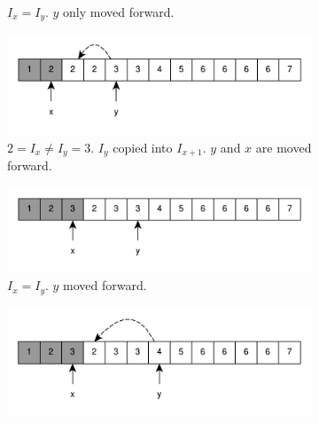 \begin{figure}
\begin{subfigure}[t]{0.49\textwidth}
		\vspace*{-8mm}
		\caption{$I_x = I_y$. $y$ only moved forward.}
		\label{fig:remove_duplicated_sorted_array_inplace:example1_3}
	 \end{subfigure}
	 \hfill
	 \begin{subfigure}[t]{0.49\textwidth}
		\includegraphics[width=1\linewidth]{sources/remove_duplicated_sorted_array_inplace/images/example1_4}
		\vspace*{-8mm}
		\caption{$2 = I_x \neq I_y = 3$. $I_y$ copied into $I_{x+1}$. $y$ and $x$ are moved forward.}
		\label{fig:remove_duplicated_sorted_array_inplace:example1_4}
	 \end{subfigure}
	 \hfill
	 \begin{subfigure}[t]{0.49\textwidth}
		\includegraphics[width=1\linewidth]{sources/remove_duplicated_sorted_array_inplace/images/example1_5}
		\vspace*{-8mm}
		\caption{$I_x = I_y$. $y$ moved forward.}
		\label{fig:remove_duplicated_sorted_array_inplace:example1_5}
	 \end{subfigure}
	 \hfill
	 \begin{subfigure}[t]{0.49\textwidth}
		\includegraphics[width=1\linewidth]{sources/remove_duplicated_sorted_array_inplace/images/example1_7}

\end{subfigure}
\end{figure}
